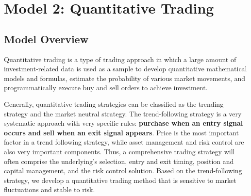 \documentclass{mcmthesis}
\begin{document}

\section{Model 2: Quantitative Trading}
\subsection{Model Overview}
Quantitative trading is a type of trading approach in which a large amount of investment-related data is used as a sample to develop quantitative mathematical models and formulas, estimate the probability of various market movements, and programmatically execute buy and sell orders to achieve investment\cite{Quan1}.

Generally, quantitative trading strategies can be classified as the trending strategy and the market neutral strategy. The trend-following strategy is a very systematic approach with very specific rules: \textbf{purchase when an entry signal occurs and sell when an exit signal appears}. Price is the most important factor in a trend following strategy, while asset management and risk control are also very important components. Thus, a comprehensive trading strategy will often comprise the underlying's selection, entry and exit timing, position and capital management, and the risk control solution. Based on the trend-following strategy, we develop a quantitative trading method that is sensitive to market fluctuations and stable to risk.
\end{document}
